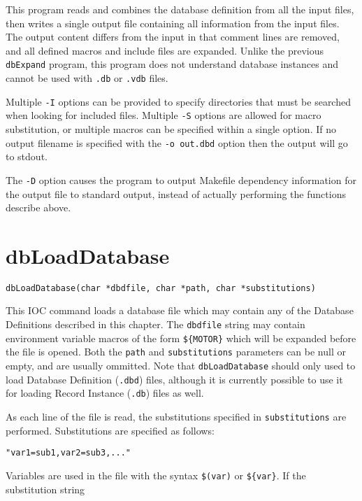 This program reads and combines the database definition from all the input files, then writes a single output file containing all information from the 
input files.
The output content differs from the input in that comment lines are removed, and all defined macros and include files are expanded.
Unlike the previous \verb|dbExpand| program, this program does not understand database instances and cannot be used with \verb|.db| or \verb|.vdb| files.

Multiple \verb|-I| options can be provided to specify directories that must be searched when looking for included files.
Multiple \verb|-S| options are allowed for macro substitution, or multiple macros can be specified within a single option.
If no output filename is specified with the \verb|-o out.dbd| option then the output will go to stdout.

The \verb|-D| option causes the program to output Makefile dependency information for the output file to standard output, instead of actually performing the functions describe above.

\section{dbLoadDatabase}

\begin{verbatim}
dbLoadDatabase(char *dbdfile, char *path, char *substitutions)
\end{verbatim}

This IOC command loads a database file which may contain any of the Database Definitions described in this chapter.
The \verb|dbdfile| string may contain environment variable macros of the form \verb|${MOTOR}| which will be expanded before the file is opened.
Both the \verb|path| and \verb|substitutions| parameters can be null or empty, and are usually ommitted.
Note that \verb|dbLoadDatabase| should only used to load Database Definition (\verb|.dbd|) files, although it is currently possible to use it for loading Record Instance (\verb|.db|) files as well.

As each line of the file is read, the substitutions specified in \verb|substitutions| are performed. Substitutions are specified as follows:

\begin{verbatim}
"var1=sub1,var2=sub3,..."
\end{verbatim}

Variables are used in the file with the syntax \verb|$(var)| or \verb|${var}|.
If the substitution string

